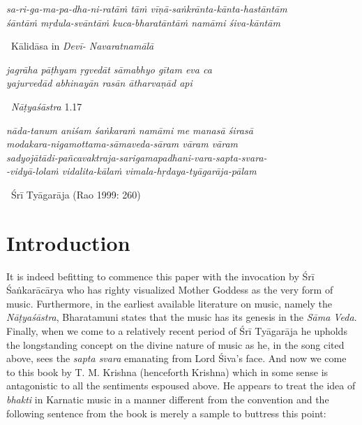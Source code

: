 \begin{myquote}
\textit{sa-ri-ga-ma-pa-dha-ni-ratāṁ tāṁ vīṇā-saṅkrānta-kānta-hastāntām }\\\textit{śāntāṁ mṛdula-svāntāṁ kuca-bharatāntāṁ namāmi śiva-kāntām} 

~\hfill Kālidāsa in \textit{Devī- Navaratnamālā}
\end{myquote}

\begin{myquote}
\textit{jagrāha pāṭhyam ṛgvedāt sāmabhyo gītam eva ca }\\\textit{yajurvedād abhinayān rasān ātharvaṇād api } 

~\hfill \textit{Nāṭyaśāstra} 1.17
\end{myquote}

\begin{myquote}
\textit{nāda-tanum aniśam śaṅkaraṁ namāmi me manasā śirasā}\\\textit{modakara-nigamottama-sāmaveda-sāram vāram vāram}\\\textit{sadyojātādi-pañcavaktraja-sarigamapadhani-vara-sapta-svara-}\\\textit{-vidyā-lolaṁ vidalita-kālaṁ vimala-hṛdaya-tyāgarāja-pālam} 

~\hfill Śrī Tyāgarāja (Rao 1999: 260)
\end{myquote}

\vspace{-.4cm}

\section*{Introduction}

It is indeed befitting to commence this paper with the invocation by Śrī Śaṅkarācārya who has righty visualized Mother Goddess as the very form of music. Furthermore, in the earliest available literature on music, namely the \textit{Nāṭyaśāstra}, Bharatamuni states that the music has its genesis in the \textit{Sāma Veda}. Finally, when we come to a relatively recent period of Śrī Tyāgarāja he upholds the longstanding concept on the divine nature of music as he, in the song cited above, sees the \textit{sapta svara} emanating from Lord Śiva’s face. And now we come to this book by T. M. Krishna (henceforth Krishna) which in some sense is antagonistic to all the sentiments espoused above. He appears to treat the idea of \textit{bhakti} in Karnatic music in a manner different from the convention and the following sentence from the book is merely a sample to buttress this point:

